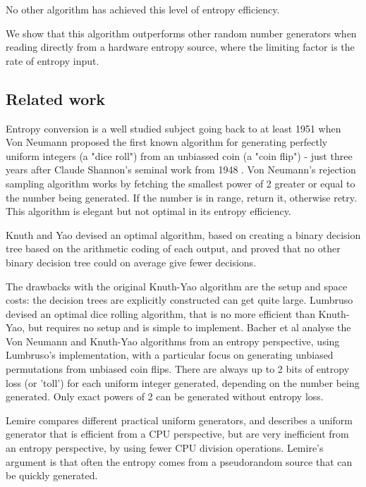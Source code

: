 \documentclass[12pt]{article}
\begin{document}
No other algorithm has achieved this level of entropy efficiency.

We show that this algorithm outperforms other random number generators when reading directly from a hardware entropy source, where the limiting factor is the rate of entropy input.

\subsection{Related work}

Entropy conversion is a well studied subject going back to at least 1951 when Von Neumann \cite{neumann51} proposed the first known algorithm for generating perfectly uniform integers (a "dice roll") from an unbiassed coin (a "coin flip") - just three years after Claude Shannon's seminal work from 1948 \cite{shannon1948mathematical}. Von Neumann's rejection sampling algorithm works by fetching the smallest power of 2 greater or equal to the number being generated. If the number is in range, return it, otherwise retry. This algorithm is elegant but not optimal in its entropy efficiency.

Knuth and Yao \cite{Knuth1976TheCO} devised an optimal algorithm, based on creating a binary decision tree based on the arithmetic coding of each output, and proved that no other binary decision tree could on average give fewer decisions.

The drawbacks with the original Knuth-Yao algorithm are the setup and space costs: the decision trees are explicitly constructed can get quite large. Lumbruso \cite{lumbroso2013optimal} devised an optimal dice rolling algorithm, that is no more efficient than Knuth-Yao, but requires no setup and is simple to implement. Bacher et al \cite{bacher2017} analyse the Von Neumann and Knuth-Yao algorithms from an entropy perspective, using Lumbruso's implementation, with a particular focus on generating unbiased permutations from unbiased coin flips. There are always up to 2 bits of entropy loss (or 'toll') for each uniform integer generated, depending on the number being generated. Only exact powers of 2 can be generated without entropy loss.

Lemire \cite{lemire2019fast} compares different practical uniform generators, and describes a uniform generator that is efficient from a CPU perspective, but are very inefficient from an entropy perspective, by using fewer CPU division operations. Lemire's argument is that often the entropy comes from a pseudorandom source that can be quickly generated.
\end{document}
